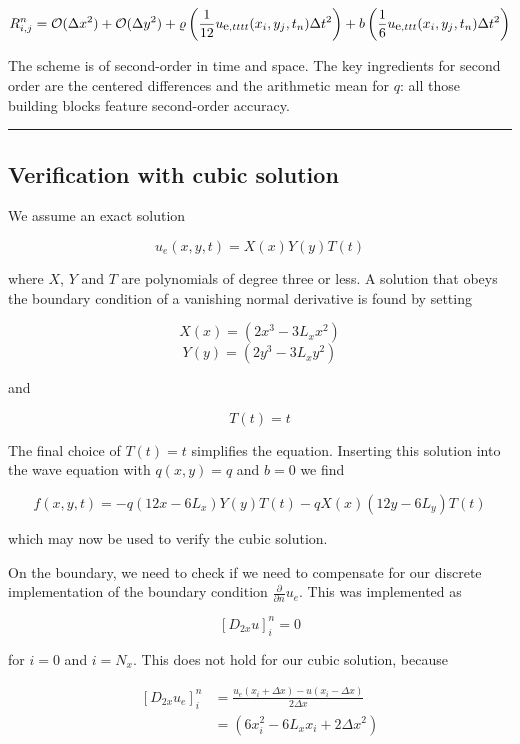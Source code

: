 \documentclass[letterpaper,10pt,english]{/usr/share/sphinx/texinputs/sphinxhowto}
\begin{document}
\begin{align*}
R^n_{i,j} = {\mathcal{O}(\Delta x^2)} + {\mathcal{O}(\Delta y^2)}+\varrho\left(\frac{1}{12}{u_{\small\mbox{e}, tttt}}(x_i,y_j,t_n)\Delta t^2 \right)
+ b \left(\frac{1}{6}u_{\small\mbox{e}, ttt}(x_i,y_j,t_n) \Delta t^2 
\right) 
\end{align*}

The scheme is of second-order in time and space. The key ingredients for
second order are the centered differences and the arithmetic mean for
$q$: all those building blocks feature second-order accuracy.\begin{center}\rule{3in}{0.4pt}\end{center}

\subsection{Verification with cubic solution}

We assume an exact solution

\[u_e(x,y,t) = X(x)Y(y)T(t)\]

where $X$, $Y$ and $T$ are polynomials of degree three or less. A
solution that obeys the boundary condition of a vanishing normal
derivative is found by setting

\[X(x) = (2x^3 - 3 L_x x^2)\] \[Y(y) = (2y^3 - 3 L_x y^2)\]

and

\[T(t) = t\]

The final choice of $T(t) = t$ simplifies the equation. Inserting this
solution into the wave equation with $q(x,y)=q$ and $b=0$ we find

\[f(x,y,t) = - q (12x - 6L_x) Y(y) T(t) - q X(x)(12y - 6L_y) T(t)\]

which may now be used to verify the cubic solution.

On the boundary, we need to check if we need to compensate for our
discrete implementation of the boundary condition
$\frac{\partial}{\partial n}u_e$. This was implemented as

\[ \left [ D_{2x} u \right]_{i}^n = 0 \]

for $i=0$ and $i=N_x$. This does not hold for our cubic solution,
because

\begin{align*} 
   \left [ D_{2x} u_e \right ]_{i}^n &= \frac{u_e(x_i + \Delta x) - u(x_i - \Delta x)}{2 \Delta x} \\
                                     &= (6x_i^2 - 6 L_x x_i + 2 \Delta x^2)
\end{align*}
\end{document}
